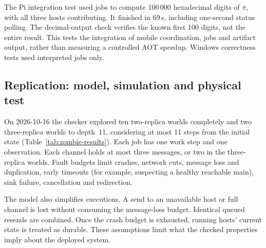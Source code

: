 The Pi integration test used jobs to compute 100\,000 hexadecimal digits
of $\pi$, with all three hosts contributing. It finished in 69\,s,
including one-second status polling. The decimal-output check verifies
the known first 100 digits, not the entire result. This tests the
integration of mobile coordination, jobs and artifact output, rather
than measuring a controlled AOT speedup. Windows correctness tests used
interpreted jobs only.

\subsection{Replication: model, simulation and physical test}\label{sec:evaluation-zombies}

On 2026-10-16 the checker explored ten two-replica worlds completely and
two three-replica worlds to depth~11, considering at most 11 steps from
the initial state (Table~\ref{tab:zombie-results}).
Each job has one work step and one observation. Each channel holds at
most three messages, or two in the three-replica worlds. Fault budgets
limit crashes, network cuts, message loss and duplication, early
timeouts (for example, suspecting a healthy reachable main), sink
failure, cancellation and redirection.

The model also simplifies executions. A send to an unavailable host or
full channel is lost without consuming the message-loss budget. Identical
queued resends are combined. Once the crash budget is exhausted, running
hosts' current state is treated as durable. These assumptions limit what
the checked properties imply about the deployed system.

